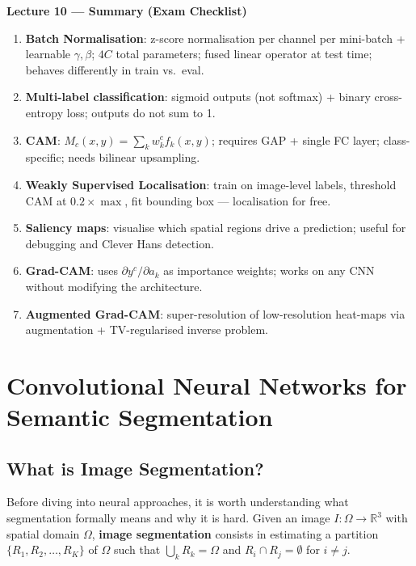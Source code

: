 \documentclass[11pt,a4paper]{article}
\newcommand{\term}[1]{\textcolor{DefGreen}{\textbf{#1}}\index{#1}}
\begin{document}
\begin{tcolorbox}[colback=WarningRedBg,colframe=WarningRed,boxrule=0.8pt,arc=3pt]
\textbf{Lecture 10 — Summary (Exam Checklist)}
\begin{enumerate}
  \item \textbf{Batch Normalisation}: z-score normalisation per channel per mini-batch + learnable $\gamma, \beta$; $4C$ total parameters; fused linear operator at test time; behaves differently in train vs.\ eval.
  \item \textbf{Multi-label classification}: sigmoid outputs (not softmax) + binary cross-entropy loss; outputs do not sum to 1.
  \item \textbf{CAM}: $M_c(x,y) = \sum_k w_k^c f_k(x,y)$; requires GAP + single FC layer; class-specific; needs bilinear upsampling.
  \item \textbf{Weakly Supervised Localisation}: train on image-level labels, threshold CAM at $0.2 \times \max$, fit bounding box — localisation for free.
  \item \textbf{Saliency maps}: visualise which spatial regions drive a prediction; useful for debugging and Clever Hans detection.
  \item \textbf{Grad-CAM}: uses $\partial y^c / \partial a_k$ as importance weights; works on any CNN without modifying the architecture.
  \item \textbf{Augmented Grad-CAM}: super-resolution of low-resolution heat-maps via augmentation + TV-regularised inverse problem.
\end{enumerate}
\end{tcolorbox}

\section{Convolutional Neural Networks for Semantic Segmentation}
\label{sec:semseg}

\subsection{What is Image Segmentation?}

Before diving into neural approaches, it is worth understanding what segmentation formally means and why it is hard. Given an image $I : \Omega \to \mathbb{R}^3$ with spatial domain $\Omega$, \term{image segmentation} consists in estimating a partition $\{R_1, R_2, \ldots, R_K\}$ of $\Omega$ such that $\bigcup_k R_k = \Omega$ and $R_i \cap R_j = \emptyset$ for $i \neq j$.
\end{document}
